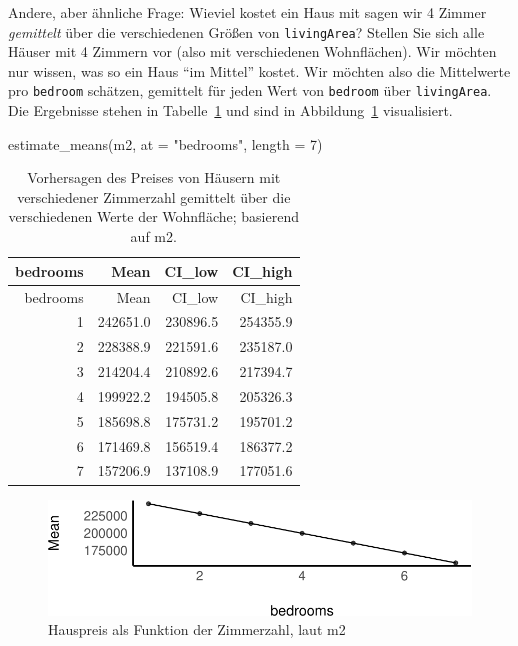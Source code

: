 \documentclass[
  a4paper,
  DIV=11]{scrreprt}
\newenvironment{Shaded}{\begin{snugshade}}{\end{snugshade}}
\newcommand{\AttributeTok}[1]{\textcolor[rgb]{0.40,0.45,0.13}{#1}}
\newcommand{\DecValTok}[1]{\textcolor[rgb]{0.68,0.00,0.00}{#1}}
\newcommand{\FunctionTok}[1]{\textcolor[rgb]{0.28,0.35,0.67}{#1}}
\newcommand{\NormalTok}[1]{\textcolor[rgb]{0.00,0.23,0.31}{#1}}
\newcommand{\StringTok}[1]{\textcolor[rgb]{0.13,0.47,0.30}{#1}}
\theoremstyle{definition}
\theoremstyle{remark}
\begin{document}
Andere, aber ähnliche Frage: Wieviel kostet ein Haus mit sagen wir 4
Zimmer \emph{gemittelt} über die verschiedenen Größen von
\texttt{livingArea}? Stellen Sie sich alle Häuser mit 4 Zimmern vor
(also mit verschiedenen Wohnflächen). Wir möchten nur wissen, was so ein
Haus ``im Mittel'' kostet. Wir möchten also die Mittelwerte pro
\texttt{bedroom} schätzen, gemittelt für jeden Wert von \texttt{bedroom}
über \texttt{livingArea}. Die Ergebnisse stehen in
Tabelle~\ref{tbl-m2-estimate-pred2} und sind in
Abbildung~\ref{fig-m2-preds} visualisiert.

\begin{Shaded}
\begin{Highlighting}[]
\FunctionTok{estimate\_means}\NormalTok{(m2, }\AttributeTok{at =} \StringTok{"bedrooms"}\NormalTok{, }\AttributeTok{length =} \DecValTok{7}\NormalTok{)}
\end{Highlighting}
\end{Shaded}

\hypertarget{tbl-m2-estimate-pred2}{}
\begin{longtable}[]{@{}rrrr@{}}
\caption{\label{tbl-m2-estimate-pred2}Vorhersagen des Preises von
Häusern mit verschiedener Zimmerzahl gemittelt über die verschiedenen
Werte der Wohnfläche; basierend auf m2.}\tabularnewline
\toprule()
bedrooms & Mean & CI\_low & CI\_high \\
\midrule()
\endfirsthead
\toprule()
bedrooms & Mean & CI\_low & CI\_high \\
\midrule()
\endhead
1 & 242651.0 & 230896.5 & 254355.9 \\
2 & 228388.9 & 221591.6 & 235187.0 \\
3 & 214204.4 & 210892.6 & 217394.7 \\
4 & 199922.2 & 194505.8 & 205326.3 \\
5 & 185698.8 & 175731.2 & 195701.2 \\
6 & 171469.8 & 156519.4 & 186377.2 \\
7 & 157206.9 & 137108.9 & 177051.6 \\
\bottomrule()
\end{longtable}

\begin{figure}

{\centering \includegraphics{./kausal_files/figure-pdf/fig-m2-preds-1.pdf}

}

\caption{\label{fig-m2-preds}Hauspreis als Funktion der Zimmerzahl, laut
m2}

\end{figure}
\end{document}

